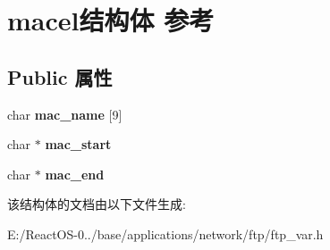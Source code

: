 \hypertarget{structmacel}{}\section{macel结构体 参考}
\label{structmacel}
\subsection*{Public 属性}
\begin{DoxyCompactItemize}
\item 
\mbox{\label{structmacel_a4f52be9152294d0978fe71319dd16197}} 
char {\bfseries mac\+\_\+name} \mbox{[}9\mbox{]}
\item 
\mbox{\label{structmacel_ac08d3bf56dadcacf54c41badb1358572}} 
char $\ast$ {\bfseries mac\+\_\+start}
\item 
\mbox{\label{structmacel_af44b9eb50f94becd059a88d379378275}} 
char $\ast$ {\bfseries mac\+\_\+end}
\end{DoxyCompactItemize}


该结构体的文档由以下文件生成\+:\begin{DoxyCompactItemize}
\item 
E\+:/\+React\+O\+S-\/0../base/applications/network/ftp/ftp\+\_\+var.\+h\end{DoxyCompactItemize}
